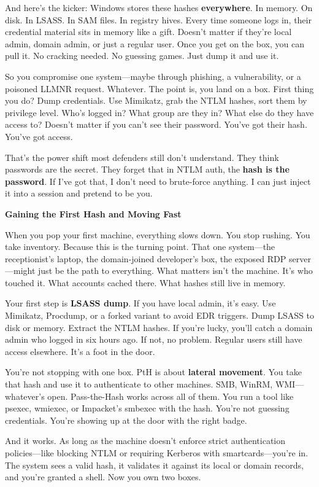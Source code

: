 And here’s the kicker: Windows stores these hashes \textbf{everywhere}. In memory. On disk. In LSASS. In SAM files. In registry hives. Every time someone logs in, their credential material sits in memory like a gift. Doesn’t matter if they’re local admin, domain admin, or just a regular user. Once you get on the box, you can pull it. No cracking needed. No guessing games. Just dump it and use it.

So you compromise one system—maybe through phishing, a vulnerability, or a poisoned LLMNR request. Whatever. The point is, you land on a box. First thing you do? Dump credentials. Use Mimikatz, grab the NTLM hashes, sort them by privilege level. Who’s logged in? What group are they in? What else do they have access to? Doesn’t matter if you can’t see their password. You’ve got their hash. You’ve got access.

That’s the power shift most defenders still don’t understand. They think passwords are the secret. They forget that in NTLM auth, the \textbf{hash is the password}. If I’ve got that, I don’t need to brute-force anything. I can just inject it into a session and pretend to be you.

\textbf{Gaining the First Hash and Moving Fast}

When you pop your first machine, everything slows down. You stop rushing. You take inventory. Because this is the turning point. That one system—the receptionist’s laptop, the domain-joined developer’s box, the exposed RDP server—might just be the path to everything. What matters isn’t the machine. It’s who touched it. What accounts cached there. What hashes still live in memory.

Your first step is \textbf{LSASS dump}. If you have local admin, it’s easy. Use Mimikatz, Procdump, or a forked variant to avoid EDR triggers. Dump LSASS to disk or memory. Extract the NTLM hashes. If you're lucky, you’ll catch a domain admin who logged in six hours ago. If not, no problem. Regular users still have access elsewhere. It’s a foot in the door.

You’re not stopping with one box. PtH is about \textbf{lateral movement}. You take that hash and use it to authenticate to other machines. SMB, WinRM, WMI—whatever’s open. Pass-the-Hash works across all of them. You run a tool like psexec, wmiexec, or Impacket’s smbexec with the hash. You’re not guessing credentials. You’re showing up at the door with the right badge.

And it works. As long as the machine doesn’t enforce strict authentication policies—like blocking NTLM or requiring Kerberos with smartcards—you’re in. The system sees a valid hash, it validates it against its local or domain records, and you’re granted a shell. Now you own two boxes.


